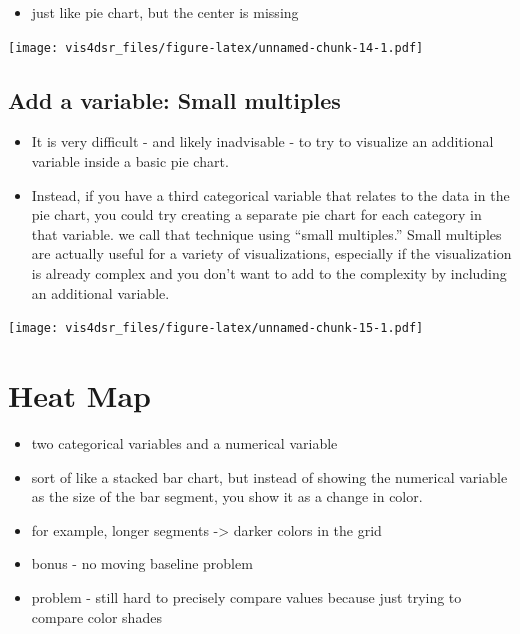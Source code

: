 \documentclass[
]{krantz}
\providecommand{\tightlist}{%
  \setlength{\itemsep}{0pt}\setlength{\parskip}{0pt}}
\begin{document}
\begin{itemize}
\tightlist
\item
  just like pie chart, but the center is missing
\end{itemize}

\texttt{[image: vis4dsr\_files/figure-latex/unnamed-chunk-14-1.pdf]}

\hypertarget{add-a-variable-small-multiples}{%
\subsection{Add a variable: Small multiples}\label{add-a-variable-small-multiples}}

\begin{itemize}
\tightlist
\item
  It is very difficult - and likely inadvisable - to try to visualize an additional
  variable inside a basic pie chart.
\item
  Instead, if you have a third categorical variable that relates to the data in
  the pie chart, you could try creating a separate pie chart for each category in
  that variable. we call that technique using ``small multiples.'' Small multiples
  are actually useful for a variety of visualizations, especially if the visualization
  is already complex and you don't want to add to the complexity by including an
  additional variable.
\end{itemize}

\texttt{[image: vis4dsr\_files/figure-latex/unnamed-chunk-15-1.pdf]}

\hypertarget{heat-map}{%
\section{Heat Map}\label{heat-map}}

\begin{itemize}
\tightlist
\item
  two categorical variables and a numerical variable
\item
  sort of like a stacked bar chart, but instead of showing the numerical
  variable as the size of the bar segment, you show it as a change in color.
\item
  for example, longer segments -\textgreater{} darker colors in the grid
\item
  bonus - no moving baseline problem
\item
  problem - still hard to precisely compare values because just trying to compare
  color shades
\end{itemize}
\end{document}
